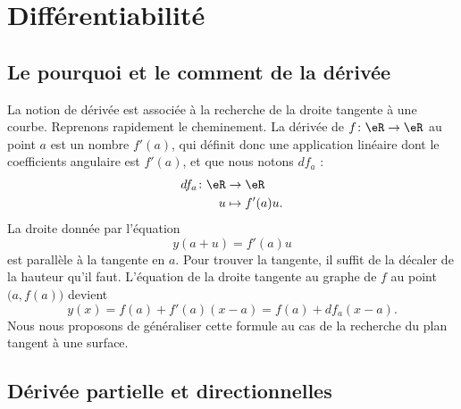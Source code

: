                     \section{Différentiabilité}

                    \subsection{Le pourquoi et le comment de la dérivée}

La notion de dérivée est associée à la recherche de la droite tangente à une courbe. Reprenons rapidement le cheminement. La dérivée de $f\colon \eR\to \eR$ au point $a$ est un nombre $f'(a)$, qui définit donc une application linéaire dont le coefficients angulaire est $f'(a)$, et que nous notons $df_a$ :
\begin{equation}
    \begin{aligned}
        df_a\colon \eR&\to \eR \\
        u&\mapsto f'(a)u. 
    \end{aligned}
\end{equation}
La droite donnée par l'équation
\begin{equation}
    y(a+u)=f'(a)u
\end{equation}
est parallèle à la tangente en $a$. Pour trouver la tangente, il suffit de la décaler de la hauteur qu'il faut. L'équation de la droite tangente au graphe de $f$ au point $\big( a,f(a) \big)$ devient
\begin{equation}        \label{EqDiffRapTgDer}
    y(x)=f(a)+f'(a)(x-a)=f(a)+df_a(x-a).
\end{equation}
Nous nous proposons de généraliser cette formule au cas de la recherche du plan tangent à une surface.
 
                    \subsection{Dérivée partielle et directionnelles}

